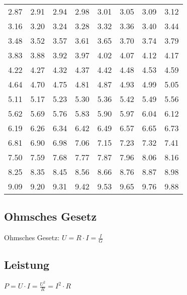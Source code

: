 \begin{emphbox}
\begin{tabular}{llllllll}
			2.87 & 2.91 & 2.94 & 2.98 & 3.01 & 3.05 & 3.09 & 3.12 \\
			3.16 & 3.20 & 3.24 & 3.28 & 3.32 & 3.36 & 3.40 & 3.44 \\
			3.48 & 3.52 & 3.57 & 3.61 & 3.65 & 3.70 & 3.74 & 3.79 \\
			3.83 & 3.88 & 3.92 & 3.97 & 4.02 & 4.07 & 4.12 & 4.17 \\
			4.22 & 4.27 & 4.32 & 4.37 & 4.42 & 4.48 & 4.53 & 4.59 \\
			4.64 & 4.70 & 4.75 & 4.81 & 4.87 & 4.93 & 4.99 & 5.05 \\
			5.11 & 5.17 & 5.23 & 5.30 & 5.36 & 5.42 & 5.49 & 5.56 \\
			5.62 & 5.69 & 5.76 & 5.83 & 5.90 & 5.97 & 6.04 & 6.12 \\
			6.19 & 6.26 & 6.34 & 6.42 & 6.49 & 6.57 & 6.65 & 6.73 \\
			6.81 & 6.90 & 6.98 & 7.06 & 7.15 & 7.23 & 7.32 & 7.41 \\
			7.50 & 7.59 & 7.68 & 7.77 & 7.87 & 7.96 & 8.06 & 8.16 \\
			8.25 & 8.35 & 8.45 & 8.56 & 8.66 & 8.76 & 8.87 & 8.98 \\
			9.09 & 9.20 & 9.31 & 9.42 & 9.53 & 9.65 & 9.76 & 9.88
	
\end{tabular}


	\end{emphbox}


	
\begin{sectionbox}
	\subsection{Ohmsches Gesetz}

	\begin{emphbox}
	Ohmsches Gesetz: $ U = R \cdot I = \frac{I}{G} $
	\end{emphbox}

	\subsection{Leistung}

	\begin{emphbox}
	$ P = U \cdot I = \frac{U^2}{R} = I^2 \cdot R $
	\end{emphbox}
	

		
\end{sectionbox}

